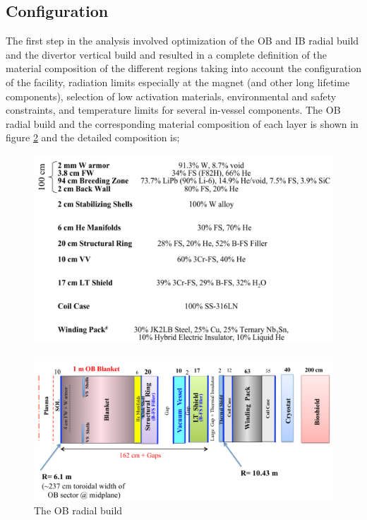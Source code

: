 \documentclass[12pt, letterpaper]{elsarticle}
\begin{document}
\subsection{Configuration} \label{Configuration}
The first step in the analysis involved optimization of the OB and IB radial build and the divertor vertical build \cite{ref_2} and resulted in a complete definition of the material composition of the different regions taking into account the configuration of the facility, radiation limits especially at the magnet (and other long lifetime components), selection of low activation materials, environmental and safety constraints, and temperature limits for several in-vessel components. The OB radial build and the corresponding material composition of each layer is shown in figure \ref{fig:OB_radial} and the detailed composition is;
\begin{figure}[h!]
  \centering
  \includegraphics[scale=0.2]{../plots/OB_comp.png}
  \label{fig:OB_comp}
\end{figure}
\begin{figure}[h!]
  \centering
  \includegraphics[scale=0.2]{../plots/OB_radial.png}
  \caption{The OB radial build}
  \label{fig:OB_radial}
\end{figure}
\end{document}
